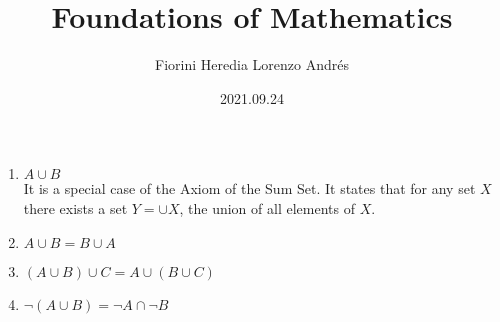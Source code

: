 \documentclass[11pt]{article}
\author{Fiorini Heredia Lorenzo Andrés}
\title{Foundations of Mathematics}
\date{2021.09.24}
\begin{document}
\setstretch{}

\begin{enumerate}

\item $A \cup  B$  \\
	It is a special case of the Axiom of the Sum Set. 
	It states that for any set $X$ there exists a set $Y = {\cup} X$, the union of all elements of $X$.

\item $A \cup  B = B \cup  A$


\item $(A \cup  B) \cup C = A \cup (B \cup  C)$


\item $\neg(A \cup  B) =  \neg A \cap \neg B$


\end{enumerate}
\end{document}
